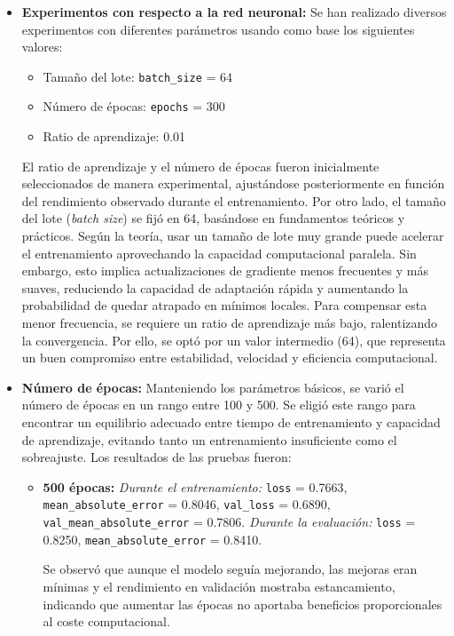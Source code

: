 \documentclass[conference,a4paper]{IEEEtran}
\begin{document}
\begin{itemize}
    \item \textbf{Experimentos con respecto a la red neuronal:}  
    Se han realizado diversos experimentos con diferentes parámetros usando como base los siguientes valores:
    \begin{itemize}
        \item Tamaño del lote: \texttt{batch\_size} = 64                
        \item Número de épocas: \texttt{epochs} = 300
        \item Ratio de aprendizaje: 0.01
    \end{itemize}

    El ratio de aprendizaje y el número de épocas fueron inicialmente seleccionados de manera experimental, ajustándose posteriormente en función del rendimiento observado durante el entrenamiento. Por otro lado, el tamaño del lote (\textit{batch size}) se fijó en 64, basándose en fundamentos teóricos y prácticos. Según la teoría, usar un tamaño de lote muy grande puede acelerar el entrenamiento aprovechando la capacidad computacional paralela. Sin embargo, esto implica actualizaciones de gradiente menos frecuentes y más suaves, reduciendo la capacidad de adaptación rápida y aumentando la probabilidad de quedar atrapado en mínimos locales. Para compensar esta menor frecuencia, se requiere un ratio de aprendizaje más bajo, ralentizando la convergencia. Por ello, se optó por un valor intermedio (64), que representa un buen compromiso entre estabilidad, velocidad y eficiencia computacional.

    \item \textbf{Número de épocas:}  
    Manteniendo los parámetros básicos, se varió el número de épocas en un rango entre 100 y 500. Se eligió este rango para encontrar un equilibrio adecuado entre tiempo de entrenamiento y capacidad de aprendizaje, evitando tanto un entrenamiento insuficiente como el sobreajuste. Los resultados de las pruebas fueron:

    \begin{itemize}
        \item \textbf{500 épocas:}  
        \textit{Durante el entrenamiento:}  
        \texttt{loss} = 0.7663, \texttt{mean\_absolute\_error} = 0.8046,  
        \texttt{val\_loss} = 0.6890, \texttt{val\_mean\_absolute\_error} = 0.7806.  
        \textit{Durante la evaluación:}  
        \texttt{loss} = 0.8250, \texttt{mean\_absolute\_error} = 0.8410.

        Se observó que aunque el modelo seguía mejorando, las mejoras eran mínimas y el rendimiento en validación mostraba estancamiento, indicando que aumentar las épocas no aportaba beneficios proporcionales al coste computacional.


\end{itemize}
\end{itemize}
\end{document}
